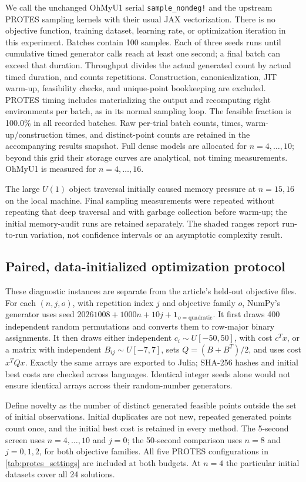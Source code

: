 We call the unchanged OhMyU1 serial \texttt{sample\_nondeg!} and the upstream
PROTES sampling kernels with their usual JAX vectorization. There is no
objective function, training dataset, learning rate, or optimization iteration
in this experiment. Batches contain 100 samples. Each of three seeds runs
until cumulative timed generator calls reach at least one second; a final
batch can exceed that duration. Throughput divides the actual generated
count by actual timed duration, and counts repetitions. Construction,
canonicalization, JIT warm-up, feasibility checks, and unique-point bookkeeping
are excluded. PROTES timing includes materializing the output and recomputing
right environments per batch, as in its normal sampling loop.
The feasible fraction is 100.0\% in all recorded batches. Raw per-trial
batch counts, times, warm-up/construction times, and distinct-point counts
are retained in the accompanying results snapshot. Full dense models are
allocated for $n=4,\ldots,10$; beyond this grid their storage curves are
analytical, not timing measurements. OhMyU1 is measured for $n=4,\ldots,16$.

The large $U(1)$ object traversal initially caused memory pressure at
$n=15,16$ on the local machine. Final sampling measurements were repeated
without repeating that deep traversal and with garbage collection before
warm-up; the initial memory-audit runs are retained separately. The shaded
ranges report run-to-run variation, not confidence intervals or an
asymptotic complexity result.

\subsection{Paired, data-initialized optimization protocol}
These diagnostic instances are separate from the article's held-out objective
files. For each $(n,j,o)$, with repetition index $j$ and objective family $o$,
NumPy's generator uses seed $20261008+1000n+10j+\mathbf{1}_{o=\mathrm{quadratic}}$.
It first draws 400 independent random permutations and converts them to
row-major binary assignments. It then draws either independent
$c_i\sim U[-50,50]$, with cost $c^Tx$, or a matrix with independent
$B_{ij}\sim U[-7,7]$, sets $Q=(B+B^T)/2$, and uses cost $x^TQx$.
Exactly the same arrays are exported to Julia; SHA-256 hashes and initial
best costs are checked across languages. Identical integer seeds alone
would not ensure identical arrays across their random-number generators.

Define novelty as the number of distinct generated feasible points outside
the set of initial observations. Initial duplicates are not new, repeated
generated points count once, and the initial best cost is retained in every
method. The 5-second screen uses $n=4,\ldots,10$ and $j=0$; the 50-second
comparison uses $n=8$ and $j=0,1,2$, for both objective families. All five
PROTES configurations in \cref{tab:protes_settings} are included at both
budgets. At $n=4$ the particular initial datasets cover all 24 solutions.

